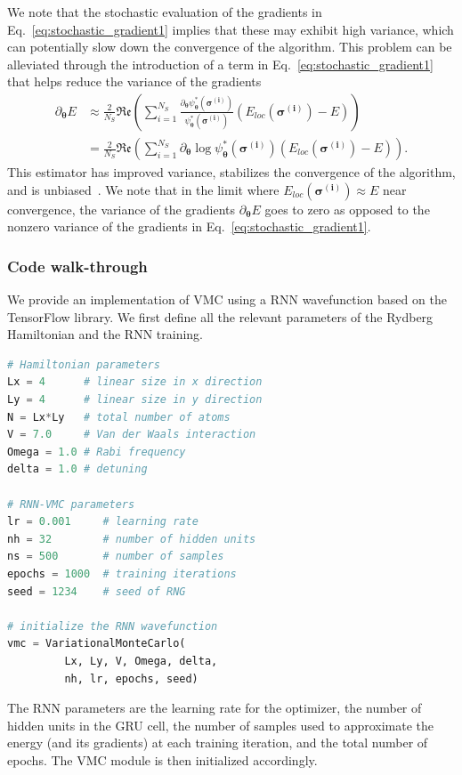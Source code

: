 \documentclass[twocolumn,english,reprint,superscriptaddress,longbibliography,pra]{revtex4-1}
\begin{document}
We note that the stochastic evaluation of the gradients in Eq.~\eqref{eq:stochastic_gradient1} implies that these may exhibit high variance, which can potentially slow down the convergence of the algorithm. This problem can be alleviated through the introduction of a term in Eq.~\eqref{eq:stochastic_gradient1} that helps reduce the variance of the gradients~\cite{RNNWF_2020}
\begin{align}
\partial_{\bm{\theta}} E &\approx
\frac{2}{N_S} \mathfrak{Re} \left ( \sum_{i=1}^{N_S}  \frac{\partial_{\bm{\theta}}\psi^{*}_{\bm{\theta}}(\bm{\sigma^{(i)}})}{\psi^{*}_{\bm{\theta}}(\bm{\sigma^{(i)}})} \left ( E_{loc}(\bm{\sigma^{(i)}}) - E \right ) \right) \nonumber\\
 &=
\frac{2}{N_S} \mathfrak{Re} \left ( \sum_{i=1}^{N_S} \partial_{{\bm{\theta}}} \log \psi^{*}_{\bm{\theta}}(\bm{\sigma^{(i)}}) \left ( E_{loc}(\bm{\sigma^{(i)}}) - E \right ) \right).
\label{eq:stochastic_gradient2}
\end{align}
This estimator has improved variance, stabilizes the convergence of the algorithm, and is unbiased~\cite{RNNWF_2020}. We note that in the limit where $E_{loc}(\bm{\sigma^{(i)}}) \approx E$ near convergence, the variance of the gradients $\partial_{{\bm{\theta}}} E$ goes to zero as opposed to the nonzero variance of the gradients in Eq.~\eqref{eq:stochastic_gradient1}. 



\subsubsection*{Code walk-through}
We provide an implementation of VMC using a RNN wavefunction based on the TensorFlow library. We first define all the relevant parameters of the Rydberg Hamiltonian and the RNN training.
\begin{lstlisting}[language=Python,numbers=none]
# Hamiltonian parameters
Lx = 4      # linear size in x direction
Ly = 4      # linear size in y direction
N = Lx*Ly   # total number of atoms
V = 7.0     # Van der Waals interaction
Omega = 1.0 # Rabi frequency
delta = 1.0 # detuning 

# RNN-VMC parameters
lr = 0.001     # learning rate
nh = 32        # number of hidden units
ns = 500       # number of samples
epochs = 1000  # training iterations
seed = 1234    # seed of RNG

# initialize the RNN wavefunction
vmc = VariationalMonteCarlo(
         Lx, Ly, V, Omega, delta,
         nh, lr, epochs, seed)
\end{lstlisting}
The RNN parameters are the learning rate for the optimizer, the number of hidden units in the GRU cell, the number of samples used to approximate the energy (and its gradients) at each training iteration, and the total number of epochs. The VMC module is then initialized accordingly.
\end{document}
